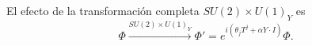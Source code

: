 El efecto de la transformaci\'on completa $SU(2)\times U(1)_Y$ es
\begin{equation}
  \Phi\overset{SU(2)\times U(1)_Y}{\longrightarrow}\Phi'=e^{i(\theta_jT^j+\alpha Y\cdot I)}\Phi.
\end{equation}

